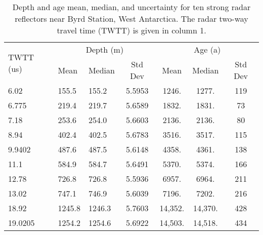 \documentclass[draft,jgrga]{agutex}
\begin{document}
\begin{table}\label{results}
\caption{Depth and age mean, median, and uncertainty for ten strong radar reflectors near Byrd Station, West Antarctica. The radar two-way travel time (TWTT) is given in column 1. }
\centering
\begin{tabular}{| l || l | l | c || c | c | c |}
\hline
\multirow{2}{*}{TWTT (us)} &  \multicolumn{3}{c||}{Depth (m)} & \multicolumn{3}{c|}{Age (a)} \\   
\cline{2-7}
 & Mean & Median & Std Dev & Mean & Median & Std Dev \\
\hline
 6.02   & 155.5  & 155.2  & 5.5953 & 1246. & 1277. & 119   \\
 6.775  & 219.4  & 219.7  & 5.6589 & 1832. & 1831. & 73   \\
 7.18   & 253.6  & 254.0  & 5.6603 & 2136. & 2136. & 80  \\
 8.94   & 402.4  & 402.5  & 5.6783 & 3516. & 3517. & 115   \\
 9.9402 & 487.6  & 487.5  & 5.6148 & 4358. & 4361. & 138   \\
 11.1   & 584.9  & 584.7  & 5.6491 & 5370. & 5374. & 166   \\
 12.78  & 726.8  & 726.8  & 5.5936 & 6957. & 6964. & 211   \\
 13.02  & 747.1  & 746.9  & 5.6039 & 7196. & 7202. & 216   \\
 18.92  & 1245.8 & 1246.3 & 5.7603 & 14,352. & 14,370. & 428   \\
 19.0205 & 1254.2 & 1254.6 & 5.6922 & 14,503. & 14,518. & 434  \\
\hline
\end{tabular}
\end{table}
\end{document}
